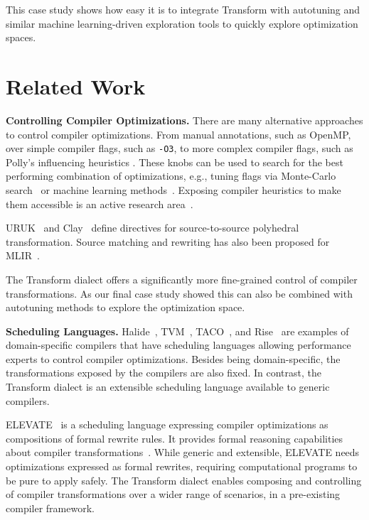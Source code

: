 \documentclass[screen,nonacm,authorversion]{acmart}
\begin{document}
This case study shows how easy it is to integrate Transform with autotuning and similar machine learning-driven exploration tools to quickly explore optimization spaces.















\section{Related Work}

\noindent\textbf{Controlling Compiler Optimizations.}
There are many alternative approaches to control compiler optimizations.
From manual annotations, such as OpenMP, over simple compiler flags, such as \texttt{-O3}, to more complex compiler flags, such as Polly's influencing heuristics \cite{grosser2012polly}.
These knobs can be used to search for the best performing combination of optimizations, e.g., tuning flags via Monte-Carlo search~\cite{DBLP:conf/pmbs-ws/KooBKWHH21} or machine learning methods~\cite{DBLP:conf/cgo/CumminsWGCAGJLT22}.
Exposing compiler heuristics to make them accessible is an active research area~\cite{DBLP:conf/cgo/SeekerCCFHL24}.

URUK~\cite{uruk} and Clay~\cite{clay} define directives for source-to-source polyhedral transformation.
Source matching and rewriting has also been proposed for MLIR~\cite{espindola2023source}.

The Transform dialect offers a significantly more fine-grained control of compiler transformations.
As our final case study showed this can also be combined with autotuning methods to explore the optimization space.



\smallskip
\noindent\textbf{Scheduling Languages.}
Halide~\cite{halide}, TVM~\cite{tvm}, TACO~\cite{taco}, and Rise~\cite{rise} are examples of domain-specific compilers that have scheduling languages allowing performance experts to control compiler optimizations.
Besides being domain-specific, the transformations exposed by the compilers are also fixed.
In contrast, the Transform dialect is an extensible scheduling language available to generic compilers.

ELEVATE~\cite{rise} is a scheduling language expressing compiler optimizations as compositions of formal rewrite rules.
It provides formal reasoning capabilities about compiler transformations~\cite{DBLP:journals/pacmpl/QinOGHKS24}.
While generic and extensible, ELEVATE needs optimizations expressed as formal rewrites, requiring computational programs to be pure to apply safely.
The Transform dialect enables composing and controlling of compiler transformations over a wider range of scenarios, in a pre-existing compiler framework.
\end{document}
